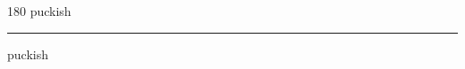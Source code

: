 
\begin{frame}
\begin{center}
\begin{turn}{180}
{\fontsize{2.5cm}{1em}\selectfont puckish}
\end{turn}
\vspace{1em}\par  
\hrule
\vspace{1em}\par  
{\fontsize{2.5cm}{1em}\selectfont puckish}
\end{center}
\end{frame}
